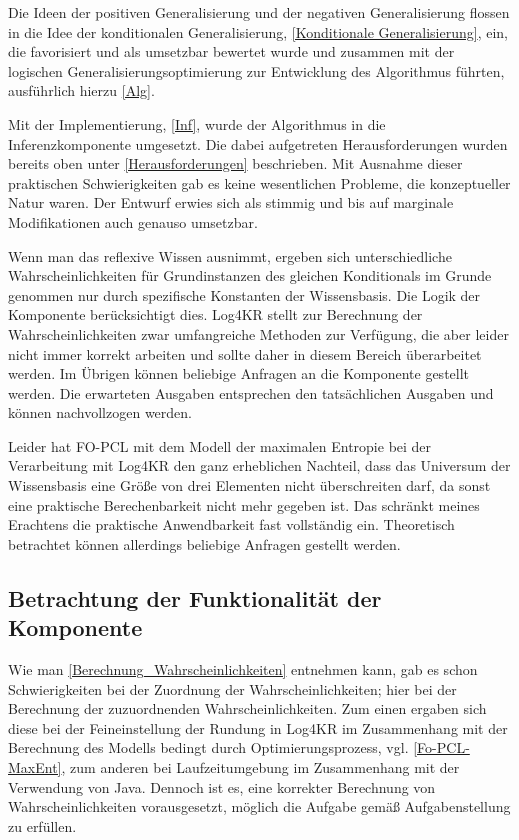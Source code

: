\documentclass[a4paper, 11pt]{book}
\begin{document}
{\begin{itemize}
\end{itemize}




Die Ideen der positiven Generalisierung und der negativen Generalisierung flossen in die Idee der konditionalen Generalisierung, \ref{Konditionale Generalisierung}, ein, die favorisiert und als umsetzbar bewertet wurde und zusammen mit der logischen Generalisierungsoptimierung zur Entwicklung des Algorithmus führten, ausführlich hierzu \ref{Alg}. 

Mit der Implementierung, \ref{Inf},  wurde der Algorithmus in die Inferenzkomponente umgesetzt. Die dabei aufgetreten Herausforderungen wurden bereits oben unter \ref{Herausforderungen}  beschrieben. Mit Ausnahme dieser praktischen Schwierigkeiten gab es keine wesentlichen Probleme, die konzeptueller Natur waren. Der Entwurf erwies sich als stimmig und bis auf marginale Modifikationen auch genauso umsetzbar. 

Wenn man das reflexive Wissen ausnimmt, ergeben sich unterschiedliche Wahrscheinlichkeiten für Grundinstanzen des gleichen Konditionals im Grunde genommen nur durch spezifische Konstanten der Wissensbasis. Die Logik der Komponente berücksichtigt dies. Log4KR stellt zur Berechnung der Wahrscheinlichkeiten zwar umfangreiche Methoden zur Verfügung, die aber leider nicht immer korrekt arbeiten und sollte daher in diesem Bereich überarbeitet werden. Im Übrigen können beliebige Anfragen an die Komponente gestellt werden. Die erwarteten Ausgaben entsprechen den tatsächlichen Ausgaben und können nachvollzogen werden. 

Leider hat FO-PCL mit dem Modell der maximalen Entropie bei der Verarbeitung mit Log4KR den ganz erheblichen Nachteil, dass das Universum der Wissensbasis eine Größe von drei Elementen nicht überschreiten darf, da sonst eine praktische Berechenbarkeit nicht mehr gegeben ist. Das schränkt meines Erachtens die praktische Anwendbarkeit fast vollständig ein. Theoretisch betrachtet können allerdings beliebige Anfragen gestellt werden.


\subsection{Betrachtung der Funktionalität der Komponente}

Wie man \ref{Berechnung_Wahrscheinlichkeiten} entnehmen kann, gab es schon Schwierigkeiten bei der Zuordnung der Wahrscheinlichkeiten; hier bei der Berechnung der zuzuordnenden Wahrscheinlichkeiten. Zum einen ergaben sich diese bei der Feineinstellung der Rundung in Log4KR im Zusammenhang mit der Berechnung des Modells bedingt durch Optimierungsprozess, vgl. \ref{Fo-PCL-MaxEnt}, zum anderen bei Laufzeitumgebung im Zusammenhang mit der Verwendung von Java. Dennoch ist es, eine korrekter Berechnung von Wahrscheinlichkeiten vorausgesetzt, möglich die Aufgabe gemäß Aufgabenstellung zu erfüllen.

}
\end{document}
